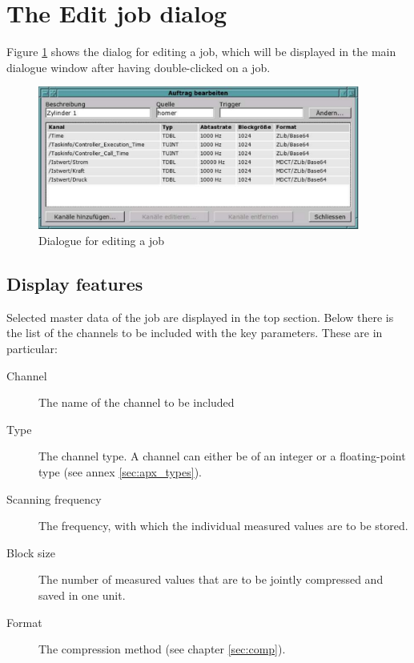 \documentclass[a4paper,12pt,BCOR6mm,bibtotoc,idxtotoc]{scrbook}
\begin{document}

\section{The \glqq Edit job dialog\grqq} \label{sec:manager_auftrag_edit}

Figure \ref{fig:dls_ctl_edit} shows the dialog for editing a job, which will be displayed in the main dialogue window after having double-clicked on a job.

\begin{figure}[tbh] \begin{center} \includegraphics[width=300pt]{bilder/ctl_edit} \end{center} \caption{Dialogue for editing a job} \label{fig:dls_ctl_edit} \end{figure}


\subsection{Display features}

Selected master data of the job are displayed in the top section. Below there is the list of the channels to be included with the key parameters. These are in particular:

\begin{description} 
\item[Channel] The name of the channel to be included 
\item[Type] The channel type. A channel can either be of an integer or a floating-point type (see annex \ref{sec:apx_types}). 
\item[Scanning frequency] The frequency, with which the individual measured values are to be stored. 
\item[Block size] The number of measured values that are to be jointly compressed and saved in one unit. 
\item[Format] The compression method (see chapter \ref{sec:comp}). \end{description}
\end{document}
